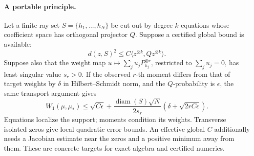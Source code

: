 \paragraph{A portable principle.}
Let a finite ray set \(S=\{h_1,\ldots,h_N\}\) be cut out by degree-\(k\)
equations whose coefficient space has orthogonal projector \(Q\).
Suppose a certified global bound is available:
\[
 d(z,S)^2\le
 C\langle z^{\otimes k},Qz^{\otimes k}\rangle.
\]
Suppose also that the weight map
\(u\mapsto\sum_j u_jP_{h_j}^{\otimes r}\), restricted to
\(\sum_j u_j=0\), has least singular value \(s_r>0\). If the observed
\(r\)-th moment differs from that of target weights by \(\delta\)
in Hilbert--Schmidt norm, and the \(Q\)-probability is \(\epsilon\),
the same transport argument gives
\begin{equation}
 W_1(\mu,\mu_*)
 \le\sqrt{C\epsilon}
 +\frac{\operatorname{diam}(S)\sqrt N}{2s_r}
       \left(\delta+\sqrt{2rC\epsilon}\right).
 \label{geo:general-cert}
\end{equation}
Equations localize the support; moments condition its weights.
Transverse isolated zeros give local quadratic error bounds. An
effective global \(C\) additionally needs a Jacobian estimate near the
zeros and a positive minimum away from them. These are concrete
targets for exact algebra and certified numerics.
